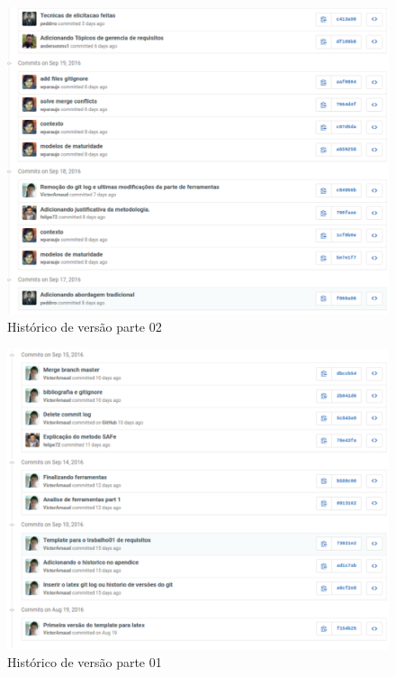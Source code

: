   \begin{figure}[!htb]
    \centering
    \includegraphics[width=15cm, keepaspectratio=true]{figuras/historico/log2.eps}
    \caption{Histórico de versão parte 02}
  \end{figure}

  \begin{figure}[!htb]
    \centering
    \includegraphics[width=15cm, keepaspectratio=true]{figuras/historico/log1.eps}
    \caption{Histórico de versão parte 01}
  \end{figure}

